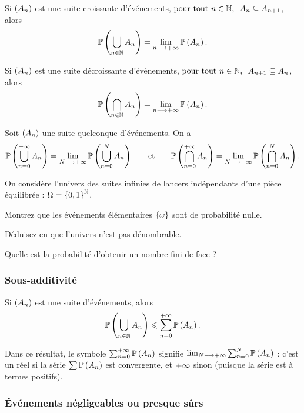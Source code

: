 \begin{prop}
Si \(\left(A_n\right)\) est une suite croissante d'événements, \cad \(\quantifs{\tpt n\in\N}A_n\subset A_{n+1}\), alors \[\mathbb{P}\left(\bigcup_{n\in\mathbb{N}}A_n\right)=\lim_{n\longrightarrow+\infty}\mathbb{P}\left(A_n\right).\]
\end{prop}

\begin{prop}
Si \(\left(A_n\right)\) est une suite décroissante d'événements, \cad \(\quantifs{\tpt n\in\N}A_{n+1}\subset A_n\), alors \[\mathbb{P}\left(\bigcap_{n\in\mathbb{N}}A_n\right)=\lim_{n\longrightarrow+\infty}\mathbb{P}\left(A_n\right).\]
\end{prop}

\begin{prop}
Soit \(\left(A_n\right)\) une suite quelconque d'événements. On a \[\mathbb{P}\left(\bigcup_{n=0}^{+\infty}A_n\right)=\lim_{N\longrightarrow+\infty}\mathbb{P}\left(\bigcup_{n=0}^NA_n\right)\qquad\text{et}\qquad\mathbb{P}\left(\bigcap_{n=0}^{+\infty}A_n\right)=\lim_{N\longrightarrow+\infty}\mathbb{P}\left(\bigcap_{n=0}^NA_n\right).\]
\end{prop}

\begin{exo}
On considère l'univers des suites infinies de lancers indépendants d'une pièce équilibrée : \(\Omega=\left\lbrace0,1\right\rbrace^{\mathbb{N}}\).

Montrez que les événements élémentaires \(\left\lbrace\omega\right\rbrace\) sont de probabilité nulle.

Déduisez-en que l'univers n'est pas dénombrable.

Quelle est la probabilité d'obtenir un nombre fini de face ?
\end{exo}

\subsubsection{Sous-additivité}

\begin{prop}
Si \(\left(A_n\right)\) est une suite d'événements, alors \[\mathbb{P}\left(\bigcup_{n\in\mathbb{N}}A_n\right)\leqslant\sum_{n=0}^{+\infty}\mathbb{P}\left(A_n\right).\]
\end{prop}

Dans ce résultat, le symbole \(\sum_{n=0}^{+\infty}\mathbb{P}\left(A_n\right)\) signifie \(\lim_{N\longrightarrow+\infty}\sum_{n=0}^N\mathbb{P}\left(A_n\right)\) : c'est un réel si la série \(\sum\mathbb{P}\left(A_n\right)\) est convergente, et \(+\infty\) sinon (puisque la série est à termes positifs).

\subsubsection{Événements négligeables ou presque sûrs}

